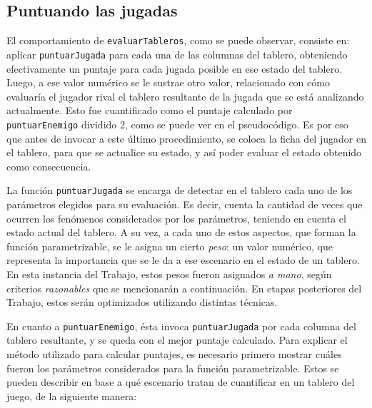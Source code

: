 \documentclass[12pt,a4paper]{article}
\begin{document}
    
    
    \subsection{Puntuando las jugadas}
    
    El comportamiento de \texttt{evaluarTableros}, como se puede observar, consiste en: aplicar \texttt{puntuarJugada} para cada una de las columnas del tablero, obteniendo efectivamente un puntaje para cada jugada posible en ese estado del tablero. Luego, a ese valor numérico se le sustrae otro valor, relacionado con cómo evaluaría el jugador rival el tablero resultante de la jugada que se está analizando actualmente. Esto fue cuantificado como el puntaje calculado por \texttt{puntuarEnemigo} dividido 2, como se puede ver en el pseudocódigo. Es por eso que antes de invocar a este último procedimiento, se coloca la ficha del jugador en el tablero, para que se actualice su estado, y así poder evaluar el estado obtenido como consecuencia.
    
    La función \texttt{puntuarJugada} se encarga de detectar en el tablero cada uno de los parámetros elegidos para su evaluación. Es decir, cuenta la cantidad de veces que ocurren los fenómenos considerados por los parámetros, teniendo en cuenta el estado actual del tablero. A su vez, a cada uno de estos aspectos, que forman la función parametrizable, se le asigna un cierto \textit{peso}: un valor numérico, que representa la importancia que se le da a ese escenario en el estado de un tablero. En esta instancia del Trabajo, estos pesos fueron asignados \textit{a mano}, según criterios \textit{razonables} que se mencionarán a continuación. En etapas posteriores del Trabajo, estos serán optimizados utilizando distintas técnicas.
    
    En cuanto a \texttt{puntuarEnemigo}, ésta invoca \texttt{puntuarJugada} por cada columna del tablero resultante, y se queda con el mejor puntaje calculado. Para explicar el método utilizado para calcular puntajes, es necesario primero mostrar cuáles fueron los parámetros considerados para la función parametrizable. Estos se pueden describir en base a qué escenario tratan de cuantificar en un tablero del juego, de la siguiente manera:
    
\end{document}
